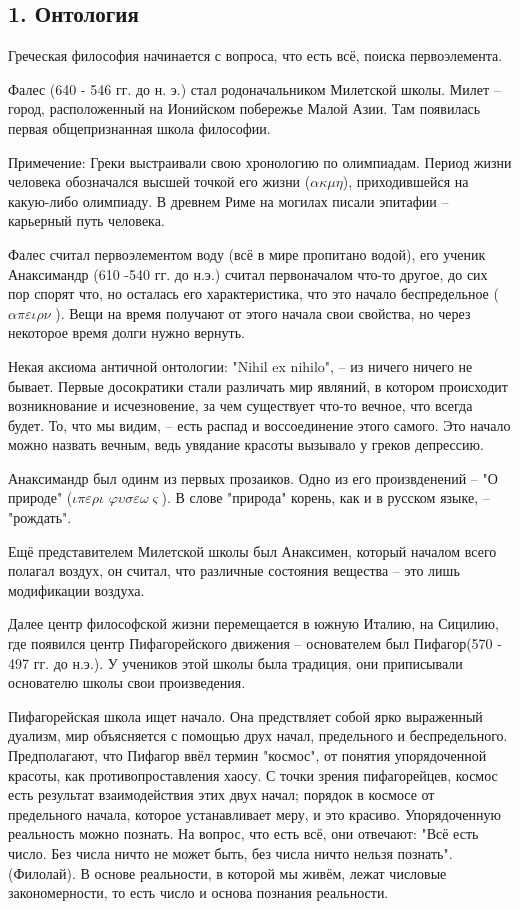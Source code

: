 \documentclass[a4paper, 12pt]{article} %
\begin{document}
\subsection*{1. Онтология}

Греческая философия начинается с вопроса, что есть всё, поиска первоэлемента.

Фалес (640 - 546 гг. до н. э.) стал родоначальником Милетской школы. Милет -- город, расположенный на Ионийском побережье Малой Азии. Там появилась первая общепризнанная школа философии.

Примечение: Греки выстраивали свою хронологию по олимпиадам. Период жизни человека обозначался высшей точкой его жизни ($\alpha \kappa \mu \eta$), приходившейся на какую-либо олимпиаду. В древнем Риме на могилах писали эпитафии -- карьерный путь человека.

Фалес считал первоэлементом воду (всё в мире пропитано водой), его ученик Анаксимандр (610 -540 гг. до н.э.) считал первоначалом что-то другое, до сих пор спорят что, но осталась его характеристика, что это начало беспредельное ($\alpha \pi \varepsilon \iota \rho \nu$ ). Вещи на время получают от этого начала свои свойства, но через некоторое время долги нужно вернуть.

Некая аксиома античной онтологии: "Nihil ex nihilo", -- из ничего ничего не бывает. Первые досократики стали различать мир являний, в котором происходит возникнование и исчезновение, за чем существует что-то вечное, что всегда будет. То, что мы видим, -- есть распад и воссоединение этого самого. Это начало можно назвать вечным, ведь увядание красоты вызывало у греков депрессию.

Анаксимандр был одинм из первых прозаиков. Одно из его произвденений -- "О природе" ($\iota \pi \varepsilon \rho \iota  $ $ \varphi \upsilon \sigma \varepsilon \omega \varsigma$). В слове "природа" корень, как и в русском языке, -- "рождать".

Ещё представителем Милетской школы был Анаксимен, который началом всего полагал воздух, он считал, что различные состояния вещества -- это лишь модификации воздуха. 

Далее центр философской жизни перемещается в южную Италию, на Сицилию, где появился центр Пифагорейского движения -- основателем был Пифагор(570 - 497 гг. до н.э.). У учеников этой школы была традиция, они приписывали основателю школы свои произведения.

Пифагорейская школа ищет начало. Она предствляет собой ярко выраженный дуализм, мир объясняется с помощью друх начал, предельного и беспредельного. Предполагают, что Пифагор ввёл термин "космос", от понятия упорядоченной красоты, как противопроставления хаосу. С точки зрения пифагорейцев, космос есть результат взаимодействия этих двух начал; порядок в космосе от предельного начала, которое устанавливает меру, и это красиво. Упорядоченную реальность можно познать. На вопрос, что есть всё, они отвечают: "Всё есть число. Без числа ничто не может быть, без числа ничто нельзя познать". (Филолай). В основе реальности, в которой мы живём, лежат числовые закономерности, то есть число и основа познания реальности.
\end{document}
